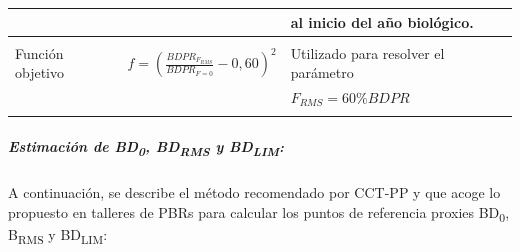 \documentclass[
  spanish,
]{article}
\begin{document}
\begin{table}[h]
{\begin{tabular}{|l|c|l|}
                        &                                                                                & al inicio del año biológico.\\ \hline
                        &                                                                                & \\ 
  Función objetivo      & $f=(\frac{BDPR_{F_{RMS}}}{BDPR_{F=0}}-0,60)^2$                                 &  Utilizado para resolver el parámetro \\
                        &                                                                                & $F_{RMS}=60\%BDPR$  \\ 
                        &                                                                                & \\ \hline
    \end{tabular}}
        \end{table}

\normalsize

\hypertarget{estimaciuxf3n-de-bd0-bdrms-y-bdlim}{%
\subparagraph{\texorpdfstring{Estimación de BD\textsubscript{0},
BD\textsubscript{RMS} y
BD\textsubscript{LIM}:}{Estimación de BD0, BDRMS y BDLIM:}}\label{estimaciuxf3n-de-bd0-bdrms-y-bdlim}}

A continuación, se describe el método recomendado por CCT-PP y que acoge
lo propuesto en talleres de PBRs para calcular los puntos de referencia
proxies BD\textsubscript{0}, B\textsubscript{RMS} y
BD\textsubscript{LIM}:
\end{document}
